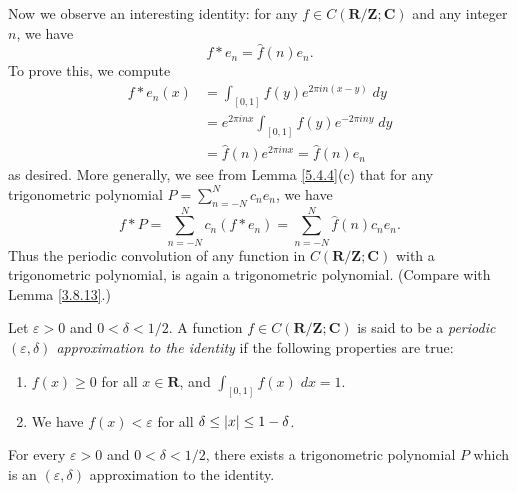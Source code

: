 \begin{note}
    Now we observe an interesting identity:
    for any \(f \in C(\mathbf{R} / \mathbf{Z} ; \mathbf{C})\) and any integer \(n\), we have
    \[
        f * e_n = \hat{f}(n) e_n.
    \]
    To prove this, we compute
    \begin{align*}
        f * e_n(x) & = \int_{[0, 1]} f(y) e^{2 \pi i n (x - y)} \; dy             \\
                   & = e^{2 \pi i n x} \int_{[0, 1]} f(y) e^{- 2 \pi i n y} \; dy \\
                   & = \hat{f}(n) e^{2 \pi i n x} = \hat{f}(n) e_n
    \end{align*}
    as desired.
    More generally, we see from Lemma \ref{5.4.4}(c) that for any trigonometric polynomial \(P = \sum_{n = -N}^N c_n e_n\), we have
    \[
        f * P = \sum_{n = -N}^N c_n (f * e_n) = \sum_{n = -N}^N \hat{f}(n) c_n e_n.
    \]
    Thus the periodic convolution of any function in \(C(\mathbf{R} / \mathbf{Z} ; \mathbf{C})\) with a trigonometric polynomial, is again a trigonometric polynomial.
    (Compare with Lemma \ref{3.8.13}.)
\end{note}

\begin{definition}\label{5.4.5}
    Let \(\varepsilon > 0\) and \(0 < \delta < 1 / 2\).
    A function \(f \in C(\mathbf{R} / \mathbf{Z} ; \mathbf{C})\) is said to be a \emph{periodic \((\varepsilon, \delta)\) approximation to the identity} if the following properties are true:
    \begin{enumerate}
        \item \(f(x) \geq 0\) for all \(x \in \mathbf{R}\), and \(\int_{[0, 1]} f(x) \; dx = 1\).
        \item We have \(f(x) < \varepsilon\) for all \(\delta \leq \abs*{x} \leq 1 - \delta\).
    \end{enumerate}
\end{definition}

\begin{lemma}\label{5.4.6}
    For every \(\varepsilon > 0\) and \(0 < \delta < 1 / 2\), there exists a trigonometric polynomial \(P\) which is an \((\varepsilon, \delta)\) approximation to the identity.
\end{lemma}


